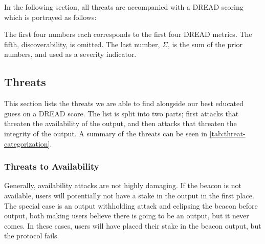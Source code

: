 In the following section, all threats are accompanied with a DREAD scoring which is portrayed as follows:
\vspace{\dimexpr-1\parsep-1\parskip\relax}%
\begin{center}
\end{center}
\vspace{\dimexpr-1\parsep-1\parskip\relax}%
The first four numbers each corresponds to the first four DREAD metrics.
The fifth, discoverability, is omitted.
The last number, $\Sigma$, is the sum of the prior numbers, and used as a severity indicator.

\subsection{Threats}
This section lists the threats we are able to find alongside our best educated guess on a DREAD score.
The list is split into two parts; first attacks that threaten the availability of the output, and then attacks that threaten the integrity of the output.
A summary of the threats can be seen in \vref{tab:threat-categorization}.


\subsubsection{Threats to Availability}
Generally, availability attacks are not highly damaging. If the beacon is not available, users will potentially not have a stake in the output in the first place. The special case is an output withholding attack and eclipsing the beacon before output, both making users believe there is going to be an output, but it never comes. In these cases, users will have placed their stake in the beacon output, but the protocol fails. 

\newcommand{\parathreat}[1]{\paragraph{#1}\hspace{-1ex}}


